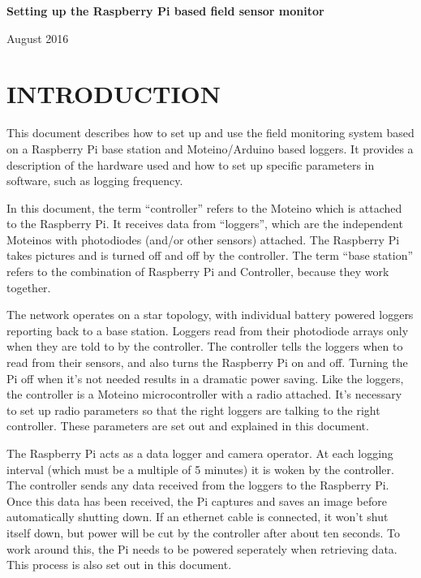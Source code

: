 \documentclass[10pt]{article}
\begin{document}
\begin{center}
\textbf{Setting up the Raspberry Pi based field sensor monitor}

August 2016
\end{center}
\newpage

\tableofcontents
\newpage

\section{INTRODUCTION}
This document describes how to set up and use the field monitoring system based on a Raspberry Pi base station and Moteino/Arduino based loggers. It provides a 
description of the hardware used and how to set up specific parameters in software, such as logging frequency.

In this document, the term ``controller'' refers to the Moteino which is attached to the Raspberry Pi. It receives data from ``loggers'', which are the independent
Moteinos with photodiodes (and/or other sensors) attached. The Raspberry Pi takes pictures and is turned off and off by the controller. The term ``base station'' refers to the combination of Raspberry Pi and Controller, because they work together.

The network operates on a star topology, with individual battery powered loggers reporting back to a base station. Loggers read from their photodiode arrays only when
they are told to by the controller. The controller tells the loggers when to read from their sensors, and also turns the Raspberry Pi on and off. Turning the Pi off when
it's not needed results in a dramatic power saving. Like the loggers, the controller is a Moteino microcontroller with a radio attached. It's necessary to set up radio
parameters so that the right loggers are talking to the right controller. These parameters are set out and explained in this document.

The Raspberry Pi acts as a data logger and camera operator. At each logging interval (which must be a multiple of 5 minutes) it is woken by the controller. The controller
sends any data received from the loggers to the Raspberry Pi. Once this data has been received, the Pi captures and saves an image before automatically shutting down. If an ethernet cable is connected, it won't shut itself down, but power will be cut by the controller after about ten seconds. To work around this, the Pi needs to be powered seperately when retrieving data. This process is also set out in this document.
\end{document}
